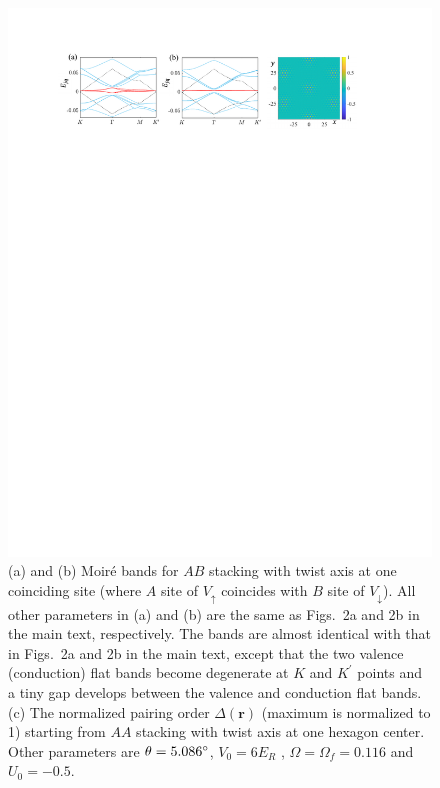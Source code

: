 \documentclass[twocolumn,english,prl,floatfix,citeautoscript,nofootinbib]{revtex4}
\begin{document}
\begin{widetext}
\begin{figure}[b]
\includegraphics[width=1.0\linewidth]{FigS4.pdf}
\caption{(a) and (b) Moir\'{e} bands for $AB$ stacking with twist axis at
one coinciding site (where $A$ site of $V_{\uparrow }$ coincides with $B$
site of $V_{\downarrow }$). All other parameters in (a) and (b) are the same
as Figs.~2a and 2b in the main text, respectively. The bands are almost
identical with that in Figs.~2a and 2b in the main text, except that the two
valence (conduction) flat bands become degenerate at $K$ and $K^{\prime }$
points and a tiny gap develops between the valence and conduction flat
bands. (c) The normalized pairing order $\Delta (\mathbf{r})$ (maximum is
normalized to 1) starting from $AA$ stacking with twist axis at one hexagon
center. Other parameters are $\protect\theta =5.086^{\circ }$, $V_{0}=6E_{R}$%
, $\Omega =\Omega _{f}=0.116$ and $U_{0}=-0.5$.}
\label{fig:S4}
\end{figure}


\end{widetext}
\end{document}
